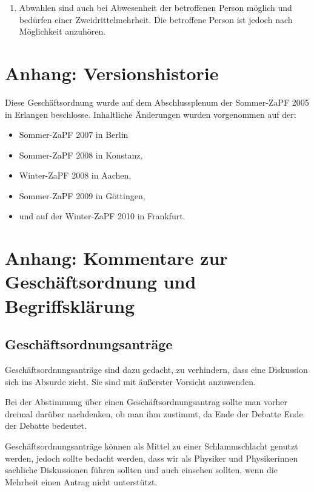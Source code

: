 \documentclass[draft,12pt,oneside]{scrreprt}
\begin{document}
\begin{enumerate}
  \item Abwahlen sind auch bei Abwesenheit der betroffenen Person möglich und
        bedürfen einer Zweidrittelmehrheit.
        Die betroffene Person ist jedoch nach Möglichkeit anzuhören.
\end{enumerate}

\section*{Anhang: Versionshistorie}

Diese Geschäftsordnung wurde auf dem Abschlussplenum der Sommer-ZaPF 2005 in
Erlangen beschlosse.
Inhaltliche Änderungen wurden vorgenommen auf der:

\begin{itemize}

  \item Sommer-ZaPF 2007 in Berlin

  \item Sommer-ZaPF 2008 in Konstanz,

  \item Winter-ZaPF 2008 in Aachen,

  \item Sommer-ZaPF 2009 in Göttingen,

  \item und auf der Winter-ZaPF 2010 in Frankfurt.

\end{itemize}

\section*{Anhang: Kommentare zur Geschäftsordnung und Begriffsklärung}

\subsection*{Geschäftsordnungsanträge}

Geschäftsordnungsanträge sind dazu gedacht, zu verhindern, dass eine Diskussion
sich ins Absurde zieht. Sie sind mit äußerster Vorsicht anzuwenden.

Bei der Abstimmung über einen Geschäftsordnungsantrag sollte man vorher dreimal
darüber nachdenken, ob man ihm zustimmt, da Ende der Debatte Ende der Debatte
bedeutet.

Geschäftsordnungsanträge können als Mittel zu einer Schlammschlacht genutzt
werden, jedoch sollte bedacht werden, dass wir als Physiker und Physikerinnen
sachliche Diskussionen führen sollten und auch einsehen sollten, wenn die
Mehrheit einen Antrag nicht unterstützt.
\end{document}
